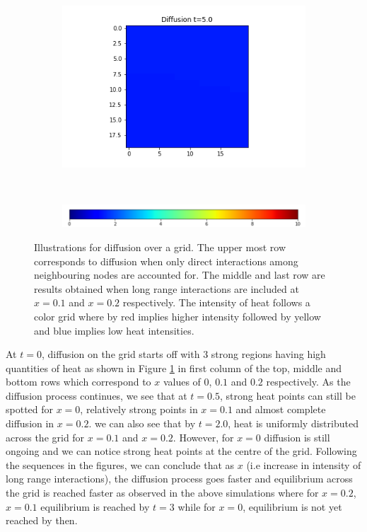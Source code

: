 \documentclass[10pt,a4paper]{article}
\begin{document}
\begin{figure}[!h]
\begin{subfigure}[b]{0.25\textwidth}
	\end{subfigure}~
	\begin{subfigure}[b]{0.25\textwidth}
		\includegraphics[width= \textwidth]{images/grid-t5-x02.png}
	\end{subfigure}\\
\vspace{0.25cm}
	 \begin{subfigure}[b]{0.60\textwidth}
	 	\includegraphics[width= \textwidth]{images/colour-bar-grid.png}
	 \end{subfigure}
\caption{Illustrations for diffusion over a grid. The upper most row corresponds to diffusion when only direct interactions among neighbouring nodes are accounted for. The middle and last row are results obtained when long range interactions are included at $x=0.1$ and $x=0.2$ respectively. The intensity of heat follows a color grid where by red implies higher intensity followed by yellow and blue implies low heat intensities.}
\label{diffusionongrid}
\end{figure}

At $t=0$, diffusion on the grid starts off with $3$ strong regions having high quantities of heat as shown in Figure \ref{diffusionongrid} in first column of the top, middle and bottom rows which correspond to $x$ values of $0$, $0.1$ and $0.2$ respectively. As the diffusion process continues, we see that at $t=0.5$, strong heat points can still be spotted for $x=0$, relatively strong points in $x=0.1$ and almost complete diffusion in $x=0.2$. we can also see that by $t=2.0$, heat is uniformly distributed across the grid for $x=0.1$ and $x=0.2$. However, for $x=0$ diffusion is still ongoing and we can notice strong heat points at the centre of the grid. Following the sequences in the figures, we can conclude that as $x$ (i.e increase in intensity of long range interactions), the diffusion process goes faster and equilibrium across the grid is reached faster as observed in the above simulations where for $x=0.2$,$x=0.1$ equilibrium is reached by $t=3$ while for $x=0$, equilibrium is not yet reached by then.

\nocite{*}


\end{document}
